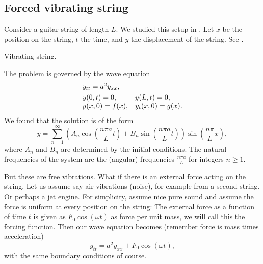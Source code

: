 

\subsection{Forced vibrating string}

Consider a guitar string of length $L$.  We studied this 
setup in .
Let $x$ be the position on the string, $t$ the time, and $y$ the displacement of the string.  See
.

\begin{myfig}
\capstart
{}
\caption{Vibrating string.\label{sps:vibstrfig}}
\end{myfig}

The problem is governed by the wave equation
\begin{equation} \label{sps:freevib}
\begin{array}{ll}
y_{tt} = a^2 y_{xx} , & \\
\noalign{\smallskip}
y(0,t) = 0 , & y(L,t) = 0 , \\
y(x,0) = f(x) , & y_t(x,0) = g(x) .
\end{array}
\end{equation}
We found that the solution is of the form
\begin{equation*}
y = 
\sum_{n=1}^\infty \left( A_n \cos \left( \frac{n\pi a}{L} t \right) +
B_n \sin \left( \frac{n\pi a}{L} t \right) \right)
\sin \left( \frac{n\pi}{L} x \right) ,
\end{equation*}
where $A_n$ and $B_n$ are determined by the initial conditions.  The natural
frequencies of the system are the (angular) frequencies $\frac{n \pi a}{L}$
for integers $n \geq 1$.

But these are free vibrations.  What if there is an external force acting on
the string.  Let us assume say air vibrations (noise), for example from a second
string.  Or perhaps a jet engine.  For simplicity, assume nice pure
sound and assume the force is uniform at every position on the string:
The external force as a function of time $t$ is given as
$F_0 \cos (\omega t)$ as force per unit mass, we will call this
the forcing function.  Then our wave
equation becomes (remember force is mass times acceleration)
\begin{equation} \label{sps:forcedeq}
y_{tt} = a^2 y_{xx} + F_0 \cos ( \omega t) ,
\end{equation}
with the same boundary conditions of course.

